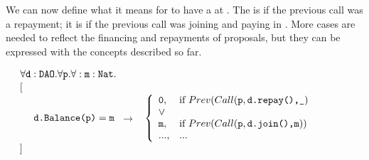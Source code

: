 \vspace{.005cm}

We can now define  what it means for  to have a   at  . The   is  if the previous call was
a repayment; it is  if  the previous call was  joining  and paying in . More cases are needed to reflect the financing and repayments of proposals, but they can be expressed with the concepts described so far.

\noindent
$\strut \hspace{0.5cm} \forall {\mbox{\tt{d}}}:{\mbox{\tt{DAO}}}.\forall {\mbox{\tt{p}}}.\forall:{\mbox{\tt{m}}}:{\mbox{\tt{Nat}}}.$\\
$\strut \hspace{0.5cm} [ \ \ \  $\\
$\strut \hspace{0.5cm} \ \  \ \  \prg{d.Balance(p)}=\prg{m}$\ $\longrightarrow$ \ $ \left\{
                            \begin{array}{ll}
                             \prg{0}, & \hbox{if}\ Prev(Call(\prg{p},\prg{d.repay(),\_})    \\
                             \vee
                             \\
                             \prg{m},  & \hbox{if}\  Prev(Call(\prg{p},\prg{d.join(),m}))   \\
                             ..., & ... 
                           \end{array} 
                         \right.    $\\
$\strut \hspace{0.5cm} ] $                         